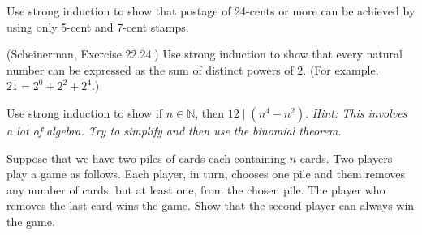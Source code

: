 \documentclass{article}
\theoremstyle{definition}
\begin{document}
\begin{question}
    Use strong induction to show that postage of 24-cents or more can be achieved by using only 5-cent and 7-cent stamps.
\end{question}
\begin{solution}
\end{solution}

\begin{question}
    (Scheinerman, Exercise 22.24:)
    Use strong induction to show that every natural number can be expressed as the sum of distinct powers of $2$.  (For example, $21 = 2^0 + 2^2 + 2^ 4$.)
\end{question}
\begin{solution}
\end{solution}


\begin{question}
    Use strong induction to show if $n\in \mathbb{N}$, then $12\mid (n^4-n^2)$. \textit{Hint: This involves a lot of algebra. Try to simplify and then use the binomial theorem.}
\end{question}
\begin{solution}
\end{solution}



\begin{question}
    Suppose that we have two piles of cards each containing $n$ cards. Two players play a game as follows. Each player, in turn, chooses one pile and them removes any number of cards. but at least one, from the chosen pile. The player who removes the last card wins the game. Show that the second player can always win the game.
\end{question}
\begin{solution}
\end{solution}
\end{document}
